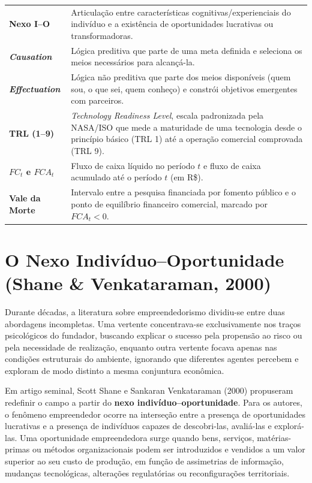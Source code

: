 \begin{boxSimbolo}
  \begin{tabularx}{\textwidth}{@{}l >{\raggedright\arraybackslash}X@{}}
    \textbf{Nexo I–O} & Articulação entre características cognitivas/experienciais do indivíduo e a existência de oportunidades lucrativas ou transformadoras. \\
    \textbf{\textit{Causation}} & Lógica preditiva que parte de uma meta definida e seleciona os meios necessários para alcançá-la. \\
    \textbf{\textit{Effectuation}} & Lógica não preditiva que parte dos meios disponíveis (quem sou, o que sei, quem conheço) e constrói objetivos emergentes com parceiros. \\
    \textbf{TRL (1–9)} & \textit{Technology Readiness Level}, escala padronizada pela NASA/ISO que mede a maturidade de uma tecnologia desde o princípio básico (TRL 1) até a operação comercial comprovada (TRL 9). \\
    \textbf{$FC_t$ e $FCA_t$} & Fluxo de caixa líquido no período $t$ e fluxo de caixa acumulado até o período $t$ (em R\$). \\
    \textbf{Vale da Morte} & Intervalo entre a pesquisa financiada por fomento público e o ponto de equilíbrio financeiro comercial, marcado por $FCA_t < 0$. \\
  \end{tabularx}
\end{boxSimbolo}

\section{O Nexo Indivíduo–Oportunidade (Shane \& Venkataraman, 2000)}

Durante décadas, a literatura sobre empreendedorismo dividiu-se entre duas abordagens incompletas. Uma vertente concentrava-se exclusivamente nos traços psicológicos do fundador, buscando explicar o sucesso pela propensão ao risco ou pela necessidade de realização, enquanto outra vertente focava apenas nas condições estruturais do ambiente, ignorando que diferentes agentes percebem e exploram de modo distinto a mesma conjuntura econômica.

Em artigo seminal, Scott Shane e Sankaran Venkataraman (2000) propuseram redefinir o campo a partir do \textbf{nexo indivíduo–oportunidade}. Para os autores, o fenômeno empreendedor ocorre na interseção entre a presença de oportunidades lucrativas e a presença de indivíduos capazes de descobri-las, avaliá-las e explorá-las. Uma oportunidade empreendedora surge quando bens, serviços, matérias-primas ou métodos organizacionais podem ser introduzidos e vendidos a um valor superior ao seu custo de produção, em função de assimetrias de informação, mudanças tecnológicas, alterações regulatórias ou reconfigurações territoriais.

